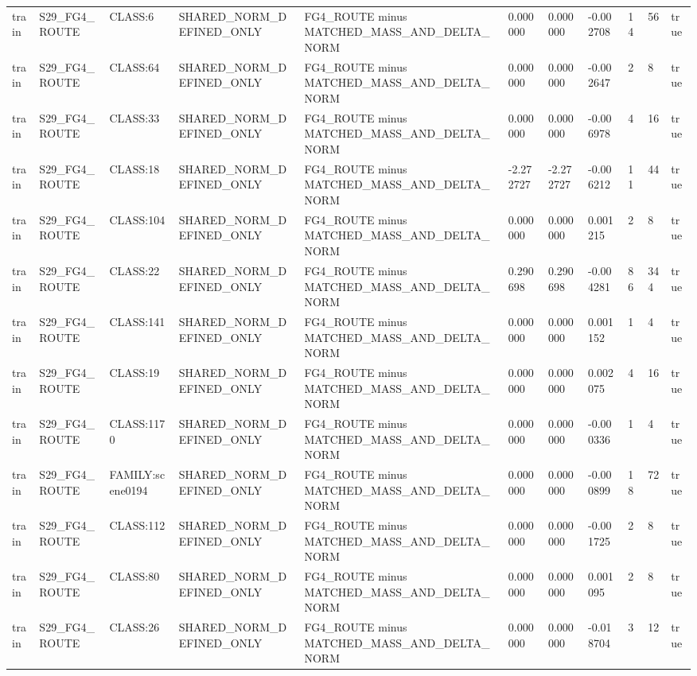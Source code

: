 \begin{tabular}{lllllllllll}
train & S29\_FG4\_ROUTE & CLASS:6 & SHARED\_NORM\_DEFINED\_ONLY & FG4\_ROUTE minus MATCHED\_MASS\_AND\_DELTA\_NORM & 0.000000 & 0.000000 & -0.002708 & 14 & 56 & true \\
train & S29\_FG4\_ROUTE & CLASS:64 & SHARED\_NORM\_DEFINED\_ONLY & FG4\_ROUTE minus MATCHED\_MASS\_AND\_DELTA\_NORM & 0.000000 & 0.000000 & -0.002647 & 2 & 8 & true \\
train & S29\_FG4\_ROUTE & CLASS:33 & SHARED\_NORM\_DEFINED\_ONLY & FG4\_ROUTE minus MATCHED\_MASS\_AND\_DELTA\_NORM & 0.000000 & 0.000000 & -0.006978 & 4 & 16 & true \\
train & S29\_FG4\_ROUTE & CLASS:18 & SHARED\_NORM\_DEFINED\_ONLY & FG4\_ROUTE minus MATCHED\_MASS\_AND\_DELTA\_NORM & -2.272727 & -2.272727 & -0.006212 & 11 & 44 & true \\
train & S29\_FG4\_ROUTE & CLASS:104 & SHARED\_NORM\_DEFINED\_ONLY & FG4\_ROUTE minus MATCHED\_MASS\_AND\_DELTA\_NORM & 0.000000 & 0.000000 & 0.001215 & 2 & 8 & true \\
train & S29\_FG4\_ROUTE & CLASS:22 & SHARED\_NORM\_DEFINED\_ONLY & FG4\_ROUTE minus MATCHED\_MASS\_AND\_DELTA\_NORM & 0.290698 & 0.290698 & -0.004281 & 86 & 344 & true \\
train & S29\_FG4\_ROUTE & CLASS:141 & SHARED\_NORM\_DEFINED\_ONLY & FG4\_ROUTE minus MATCHED\_MASS\_AND\_DELTA\_NORM & 0.000000 & 0.000000 & 0.001152 & 1 & 4 & true \\
train & S29\_FG4\_ROUTE & CLASS:19 & SHARED\_NORM\_DEFINED\_ONLY & FG4\_ROUTE minus MATCHED\_MASS\_AND\_DELTA\_NORM & 0.000000 & 0.000000 & 0.002075 & 4 & 16 & true \\
train & S29\_FG4\_ROUTE & CLASS:1170 & SHARED\_NORM\_DEFINED\_ONLY & FG4\_ROUTE minus MATCHED\_MASS\_AND\_DELTA\_NORM & 0.000000 & 0.000000 & -0.000336 & 1 & 4 & true \\
train & S29\_FG4\_ROUTE & FAMILY:scene0194 & SHARED\_NORM\_DEFINED\_ONLY & FG4\_ROUTE minus MATCHED\_MASS\_AND\_DELTA\_NORM & 0.000000 & 0.000000 & -0.000899 & 18 & 72 & true \\
train & S29\_FG4\_ROUTE & CLASS:112 & SHARED\_NORM\_DEFINED\_ONLY & FG4\_ROUTE minus MATCHED\_MASS\_AND\_DELTA\_NORM & 0.000000 & 0.000000 & -0.001725 & 2 & 8 & true \\
train & S29\_FG4\_ROUTE & CLASS:80 & SHARED\_NORM\_DEFINED\_ONLY & FG4\_ROUTE minus MATCHED\_MASS\_AND\_DELTA\_NORM & 0.000000 & 0.000000 & 0.001095 & 2 & 8 & true \\
train & S29\_FG4\_ROUTE & CLASS:26 & SHARED\_NORM\_DEFINED\_ONLY & FG4\_ROUTE minus MATCHED\_MASS\_AND\_DELTA\_NORM & 0.000000 & 0.000000 & -0.018704 & 3 & 12 & true \\

\end{tabular}
